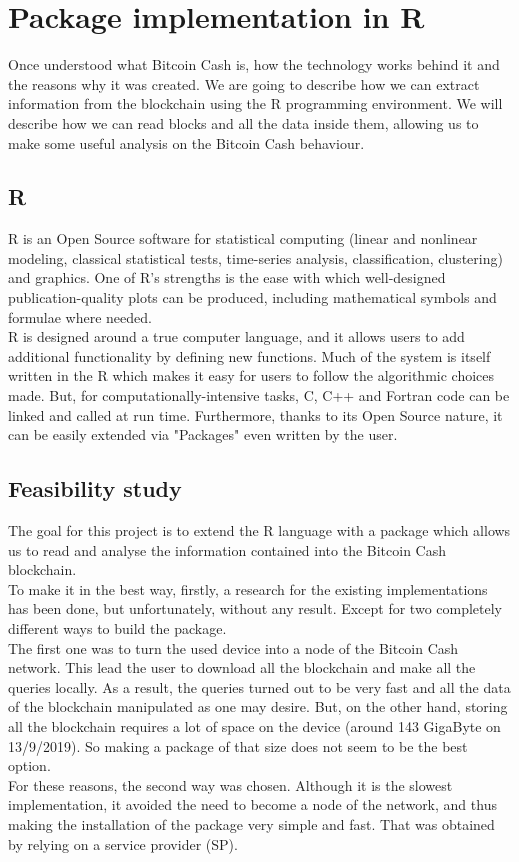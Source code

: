 
\chapter{Package implementation in R}
\label{cha:R}

Once understood what Bitcoin Cash is, how the technology works behind it and the
reasons why it was created. We are going to describe how we can extract information
from the blockchain using the R programming environment. We will describe how we
can read blocks and all the data inside them, allowing us to make some useful analysis
on the Bitcoin Cash behaviour. 

\section{R}
\label{sec:environment}

R\cite{rint} is an Open Source software for statistical computing (linear and nonlinear
 modeling, classical statistical tests, time-series analysis, classification,
 clustering) and graphics. One of R’s strengths is the ease with which well-designed 
 publication-quality plots can be produced, including mathematical symbols and 
 formulae where needed.\\
R is designed around a true computer language, and it allows users to add additional 
functionality by defining new functions. Much of the system is itself written in the 
R which makes it easy for users to follow the algorithmic choices made. But, for
computationally-intensive tasks, C, C++ and Fortran code can be linked and called 
at run time. Furthermore, thanks to its Open Source nature, it can be easily extended
via "Packages" even written by the user.\cite{rint}

\section{Feasibility study}
\label{sec:study}

The goal for this project is to extend the R language with a package which allows us
to read and analyse the information contained into the Bitcoin Cash blockchain.\\
To make it in the best way, firstly, a research for the existing implementations has 
been done, but unfortunately, without any result. Except for two 
completely different ways to build the package. \\
The first one was to turn the used device into a node of the Bitcoin Cash network.
This lead the user to download all the blockchain and make all the queries locally.
As a result, the queries turned out to be very fast and all the data of the blockchain 
manipulated as one may desire. But, on the other hand, storing all the blockchain 
requires a lot of space on the device (around 143 GigaByte on 13/9/2019). So making
a package of that size does not seem to be the best option.\\
For these reasons, the second way was chosen. Although it is the slowest implementation,
it avoided the need to become a node of the network, and thus making the installation of the
package very simple and fast. That was obtained by relying on a service provider (SP).

